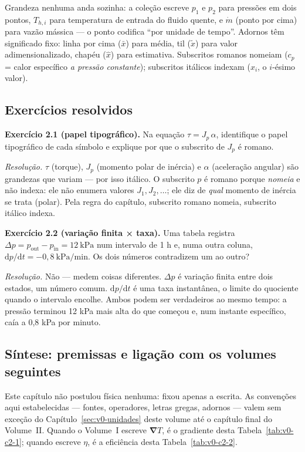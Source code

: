 \documentclass[12pt,a4paper]{article}
\numberwithin{equation}{section}
\numberwithin{table}{section}
\numberwithin{figure}{section}
\begin{document}
Grandeza nenhuma anda sozinha: a coleção escreve $p_1$ e $p_2$ para pressões
em dois pontos, $T_{h,i}$ para temperatura de entrada do fluido quente, e
$\dot{m}$ (ponto por cima) para vazão mássica --- o ponto codifica
``por unidade de tempo''. Adornos têm significado fixo: linha por cima
($\bar{x}$) para média, til ($\tilde{x}$) para valor adimensionalizado,
chapéu ($\hat{x}$) para estimativa. Subscritos romanos nomeiam
($c_p$ = calor específico \emph{a pressão constante}); subscritos itálicos
indexam ($x_i$, o $i$-ésimo valor).

\subsection{Exercícios resolvidos}

\textbf{Exercício 2.1 (papel tipográfico).} Na equação $\tau = J_p\,\alpha$,
identifique o papel tipográfico de cada símbolo e explique por que o
subscrito de $J_p$ é romano.

\emph{Resolução.} $\tau$ (torque), $J_p$ (momento polar de inércia) e
$\alpha$ (aceleração angular) são grandezas que variam --- por isso
itálico. O subscrito $p$ é romano porque \emph{nomeia} e não indexa: ele
não enumera valores $J_1, J_2, \dots$; ele diz de \emph{qual} momento de
inércia se trata (polar). Pela regra do capítulo, subscrito romano nomeia,
subscrito itálico indexa.

\textbf{Exercício 2.2 (variação finita × taxa).} Uma tabela registra
$\Delta p = p_{\mathrm{out}} - p_{\mathrm{in}} = 12\ \mathrm{kPa}$ num intervalo de 1 h e,
numa outra coluna, $\mathrm{d}p/\mathrm{d}t = -0{,}8\ \mathrm{kPa/min}$. Os
dois números contradizem um ao outro?

\emph{Resolução.} Não --- medem coisas diferentes. $\Delta p$ é variação
finita entre dois estados, um número comum. $\mathrm{d}p/\mathrm{d}t$ é
uma taxa instantânea, o limite do quociente quando o intervalo
encolhe. Ambos podem ser verdadeiros ao mesmo tempo: a pressão terminou
12 kPa mais alta do que começou e, num instante específico, caía a
0,8 kPa por minuto.




\subsection{Síntese: premissas e ligação com os volumes seguintes}

Este capítulo não postulou física nenhuma: fixou apenas a escrita. As
convenções aqui estabelecidas --- fontes, operadores, letras gregas,
adornos --- valem sem exceção do Capítulo~\ref{sec:v0-unidades} deste volume
até o capítulo final do Volume~II. Quando o Volume~I escreve
$\bm{\nabla}T$, é o gradiente desta Tabela~\ref{tab:v0-c2-1}; quando escreve
$\eta$, é a eficiência desta Tabela~\ref{tab:v0-c2-2}.
\end{document}
